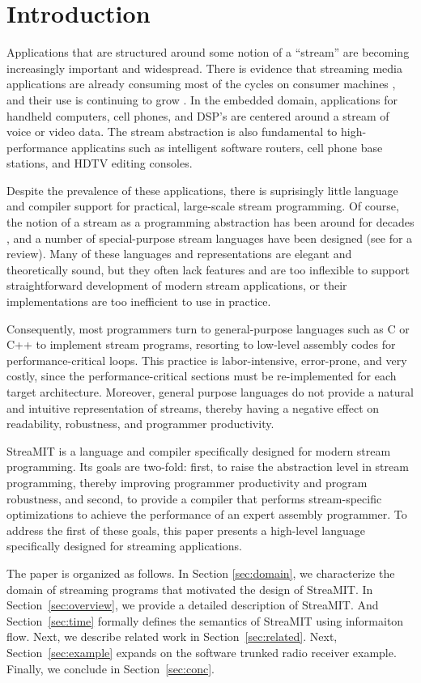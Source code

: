 \section{Introduction}

Applications that are structured around some notion of a ``stream''
are becoming increasingly important and widespread.  There is evidence
that streaming media applications are already consuming most of the
cycles on consumer machines \cite{Rix98}, and their use is continuing
to grow \cite{someone}.  In the embedded domain, applications for
handheld computers, cell phones, and DSP's are centered around a
stream of voice or video data.  The stream abstraction is also
fundamental to high-performance applicatins such as intelligent
software routers, cell phone base stations, and HDTV editing consoles.

Despite the prevalence of these applications, there is suprisingly
little language and compiler support for practical, large-scale stream
programming.  Of course, the notion of a stream as a programming
abstraction has been around for decades \cite{SICP}, and a number of
special-purpose stream languages have been designed (see
\cite{survey97} for a review).  Many of these languages and
representations are elegant and theoretically sound, but they often
lack features and are too inflexible to support straightforward
development of modern stream applications, or their implementations
are too inefficient to use in practice.

Consequently, most programmers turn to general-purpose languages such
as C or C++ to implement stream programs, resorting to low-level
assembly codes for performance-critical loops.  This practice is
labor-intensive, error-prone, and very costly, since the
performance-critical sections must be re-implemented for each target
architecture.  Moreover, general purpose languages do not provide a
natural and intuitive representation of streams, thereby having a
negative effect on readability, robustness, and programmer
productivity.

StreaMIT is a language and compiler specifically designed for modern
stream programming.  Its goals are two-fold: first, to raise the
abstraction level in stream programming, thereby improving programmer
productivity and program robustness, and second, to provide a compiler
that performs stream-specific optimizations to achieve the performance
of an expert assembly programmer.  To address the first of these
goals, this paper presents a high-level language specifically designed
for streaming applications.  

The paper is organized as follows. In Section {\ref{sec:domain}}, we
characterize the domain of streaming programs that motivated the
design of StreaMIT.  In Section~\ref{sec:overview}, we provide a
detailed description of StreaMIT. And Section~\ref{sec:time} formally
defines the semantics of StreaMIT using informaiton flow. Next, we
describe related work in Section~\ref{sec:related}.  Next,
Section~\ref{sec:example} expands on the software trunked radio
receiver example. Finally, we conclude in Section~\ref{sec:conc}.


